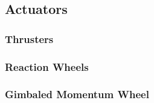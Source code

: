 \subsection{Actuators}
\subsubsection{Thrusters}
\subsubsection{Reaction Wheels}
\subsubsection{Gimbaled Momentum Wheel}